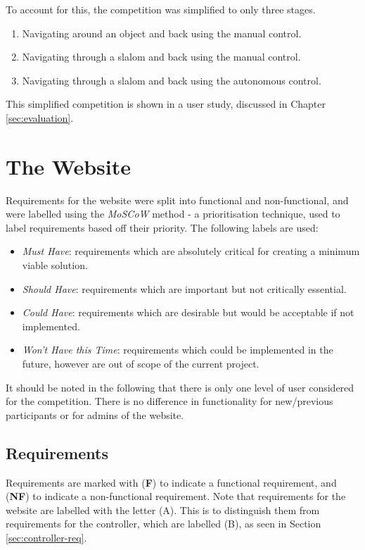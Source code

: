 \documentclass{l4proj}
\begin{document}
To account for this, the competition was simplified to only three stages. 
\begin{enumerate}
    \item Navigating around an object and back using the manual control.
    \item Navigating through a slalom and back using the manual control.
    \item Navigating through a slalom and back using the autonomous control.
\end{enumerate}

This simplified competition is shown in a user study, discussed in Chapter \ref{sec:evaluation}.


\section{The Website}\label{sec:web-requirements}
Requirements for the website were split into functional and non-functional, and were labelled using the \textit{MoSCoW} method \citep{MOSCOW} - a prioritisation technique, used to label requirements based off their priority. The following labels are used:

\begin{itemize}
    \item \textit{Must Have}: requirements which are absolutely critical for creating a minimum viable solution.
    \item \textit{Should Have}: requirements which are important but not critically essential. 
    \item \textit{Could Have}: requirements which are desirable but would be acceptable if not implemented.
    \item \textit{Won't Have this Time}: requirements which could be implemented in the future, however are out of scope of the current project.
\end{itemize}

It should be noted in the following that there is only one level of user considered for the competition. There is no difference in functionality for new/previous participants or for admins of the website.

\subsection{Requirements}
Requirements are marked with (\textbf{F}) to indicate a functional requirement, and (\textbf{NF}) to indicate a non-functional requirement. Note that requirements for the website are labelled with the letter (A). This is to distinguish them from requirements for the controller, which are labelled (B), as seen in Section \ref{sec:controller-req}.
\end{document}
